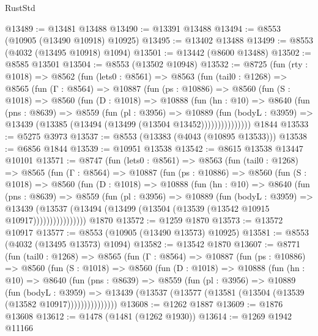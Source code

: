 \begin{lexlean}{RustStd}
\begin{coremodule}
@13489 := @13481 @13488
@13490 := @13391 @13488
@13494 := @8553 (@10905 (@13490 @10918) @10925)
@13495 := @13402 @13488
@13499 := @8553 (@4032 (@13495 @10918) @1094)
@13501 := @13442 (@8600 @13488)
@13502 := @8585 @13501
@13504 := @8553 (@13502 @10948)
@13532 := @8725
    (fun (rty : @1018) =>
    @8562
      (fun (lets0 : @8561) =>
      @8563
        (fun (tail0 : @1268) =>
        @8565
          (fun (Γ : @8564) =>
          @10887
            (fun (ps : @10886) =>
            @8560
              (fun (S : @1018) =>
              @8560
                (fun (D : @1018) =>
                @10888
                  (fun (hn : @10) =>
                  @8640
                    (fun (pns : @8639) =>
                    @8559
                      (fun (pl : @3956) =>
                      @10889
                        (fun (bodyL : @3959) =>
                        @13439 (@13385 (@13494 (@13499 (@13504 @13452)))))))))))))))
    @1844
@13533 := @5275 @3973
@13537 := @8553 (@13383 (@4043 (@10895 @13533)))
@13538 := @6856 @1844
@13539 := @10951 @13538
@13542 := @8615 @13538 @13447 @10101
@13571 := @8747
    (fun (lets0 : @8561) =>
    @8563
      (fun (tail0 : @1268) =>
      @8565
        (fun (Γ : @8564) =>
        @10887
          (fun (ps : @10886) =>
          @8560
            (fun (S : @1018) =>
            @8560
              (fun (D : @1018) =>
              @10888
                (fun (hn : @10) =>
                @8640
                  (fun (pns : @8639) =>
                  @8559
                    (fun (pl : @3956) =>
                    @10889
                      (fun (bodyL : @3959) =>
                      @13439
                        (@13537
                          (@13494 (@13499 (@13504 (@13539 (@13542 @10915 @10917))))))))))))))))
    @1870
@13572 := @1259 @1870
@13573 := @13572 @10917
@13577 := @8553 (@10905 (@13490 @13573) @10925)
@13581 := @8553 (@4032 (@13495 @13573) @1094)
@13582 := @13542 @1870
@13607 := @8771
    (fun (tail0 : @1268) =>
    @8565
      (fun (Γ : @8564) =>
      @10887
        (fun (ps : @10886) =>
        @8560
          (fun (S : @1018) =>
          @8560
            (fun (D : @1018) =>
            @10888
              (fun (hn : @10) =>
              @8640
                (fun (pns : @8639) =>
                @8559
                  (fun (pl : @3956) =>
                  @10889
                    (fun (bodyL : @3959) =>
                    @13439 (@13537 (@13577 (@13581 (@13504 (@13539 (@13582 @10917)))))))))))))))
@13608 := @1262 @1887
@13609 := @1876 @13608
@13612 := @1478 (@1481 (@1262 @1930))
@13614 := @1269 @1942 @11166

\end{coremodule}
\end{lexlean}
